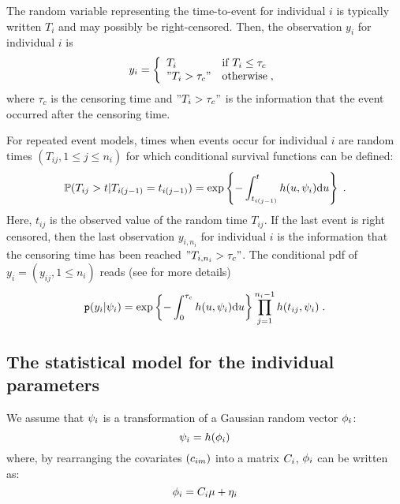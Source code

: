 The random variable representing the time-to-event for individual $i$ is typically written $T_i$ and may possibly be right-censored. Then, the observation $y_i$ for individual $i$ is
\begin{equation}
    y_i = \left\{
    \begin{array}{ll}
        T_i & \mbox{if } T_i \leq \tau_c \\
        "T_i > \tau_c" & \mbox{otherwise}\;,
    \end{array}
\right.
\end{equation}
where $\tau_c$ is the censoring time and $"T_i > \tau_c"$ is the information that the event occurred after the censoring time. 

For repeated event models, times when events occur for individual $i$ are random times $(T_{ij}, 1\leq j \leq n_i)$  for which conditional survival functions can be defined:
\begin{equation}
\mathbb{P}(T_{ij} > t|T_{i(j-1)}=t_{i(j-1)}) = \exp\left\{-\int_{t_{i(j-1)}}^{t}h(u, \psi_i)\textrm{d}u\right\}\;.
\end{equation}
Here, $t_{ij}$ is the observed value of the random time $T_{ij}$.
If the last event is right censored, then the last observation $y_{i,n_i}$ for individual $i$ is the information that the censoring time has been reached $"T_{i,n_i} > \tau_c"$. The conditional pdf of $y_i = (y_{ij},1\leq n_i)$ reads (see \cite{LavielleMonolix} for more details)
\begin{equation} \label{pdf_tte}
\texttt{p}(y_i |\psi_i) = \exp\left\{-\int_{0}^{\tau_c}h(u, \psi_i)\textrm{d}u \right\} \prod_{j=1}^{n_i-1} h(t_{ij},\psi_i)\;.
\end{equation}

\subsection{The statistical model for the individual parameters} \label{section_model_indiv}

We assume that ${\psi_i}$ is a transformation of a Gaussian random vector ${{\phi}_i}$:
\begin{equation} \label{prior2}
{\psi_i}=h({{\phi}_i})
\end{equation}
where, by rearranging the covariates $(c_{im})$ into a matrix $C_i$, ${{\phi}_i}$ can be written as:
\begin{equation} \label{prior3}
\phigi=\Covariate_i \fixed_effect + \etagi
\end{equation}

